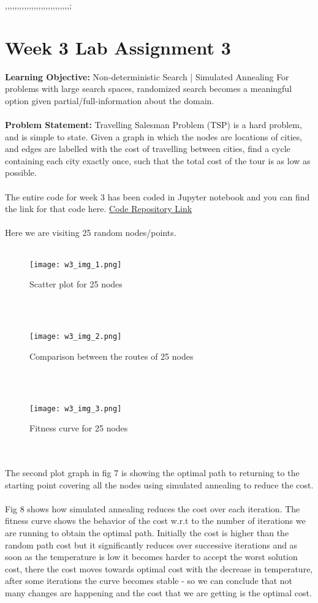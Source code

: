 ,,,,,,,,,,,,,,,,,,,,,,,,,,,;\documentclass[conference]{IEEEtran}
\begin{document}
\section{Week 3 Lab Assignment 3}
\textbf{Learning Objective:} 
Non-deterministic Search | Simulated
Annealing For problems with large search spaces, randomized search becomes a meaningful option given partial/full-information about the domain.
\\
\\
\textbf{Problem Statement:}
Travelling Salesman Problem (TSP) is a hard problem, and is simple to state. Given a graph in which the nodes are locations of cities, and edges are labelled with the cost of travelling between cities, find a cycle containing each city exactly once, such that the total cost of the tour is as low as possible.
\\
\\
The entire code for week 3 has been coded in Jupyter notebook and you can find the link for that code here.
\href{https://github.com/darshh311/CS362_lab}{Code Repository Link}
\\
\\
Here we are visiting 25 random nodes/points.
\\
\\
\begin{figure}[htbp]
\centerline{\texttt{[image: w3\_img\_1.png]}}
\caption{Scatter plot for 25 nodes}
\label{fig}
\end{figure}
\\
\\
\begin{figure}[htbp]
\centerline{\texttt{[image: w3\_img\_2.png]}}
\caption{Comparison between the routes of 25 nodes}
\label{fig}
\end{figure}
\\
\\
\begin{figure}[htbp]
\centerline{\texttt{[image: w3\_img\_3.png]}}
\caption{Fitness curve for 25 nodes}
\label{fig}
\end{figure}
\\
\\

The second plot graph in fig 7 is showing the optimal path to returning to the starting point covering all the nodes using simulated annealing to reduce the cost.
\\
\\
Fig 8 shows how simulated annealing reduces the cost over each iteration. The fitness curve shows the behavior of the cost w.r.t to the number of iterations we are running to obtain the optimal path. Initially the cost is higher than the random path cost but it significantly reduces over successive iterations and as soon as the temperature is low it becomes harder to accept the worst solution cost, there the cost moves towards optimal cost with the decrease in temperature, after some iterations the curve becomes stable - so we can conclude that not many changes are happening and the cost that we are getting is the optimal cost.
\end{document}
